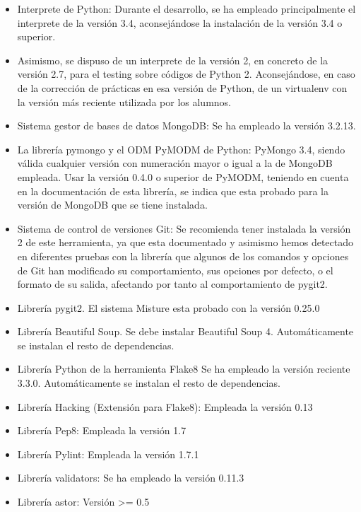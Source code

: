 \begin{itemize}
\item Interprete de Python:	Durante el desarrollo, se ha empleado principalmente el interprete de la versión 3.4, aconsejándose la instalación de la versión 3.4 o superior.

\item Asimismo, se dispuso de un interprete de la versión 2, en concreto de la versión 2.7, para el testing sobre códigos de Python 2. Aconsejándose, en caso de la corrección de prácticas en esa versión de Python, de un virtualenv con la versión más reciente utilizada por los alumnos.

\item Sistema gestor de bases de datos MongoDB: Se ha empleado la versión 3.2.13.

\item La librería pymongo y el ODM PyMODM de Python: PyMongo 3.4, siendo válida cualquier versión con numeración mayor o igual a la de MongoDB empleada.
	Usar la versión 0.4.0 o superior de PyMODM, teniendo en cuenta en la documentación de esta librería, se indica que esta probado para la versión de MongoDB que se tiene instalada.	

\item Sistema de control de versiones Git: Se recomienda tener instalada la versión 2 de este herramienta, ya que esta documentado y asimismo hemos detectado en diferentes pruebas con la librería que algunos de los comandos y opciones de Git han modificado su comportamiento, sus opciones por defecto, o el formato de su salida, afectando por tanto al comportamiento de pygit2.

\item Librería pygit2. El sistema Misture esta probado con la versión 0.25.0

\item Librería Beautiful Soup.
	Se debe instalar Beautiful Soup 4.
	Automáticamente se instalan el resto de dependencias.

\item Librería Python de la herramienta Flake8
	Se ha empleado la versión reciente 3.3.0.
	Automáticamente se instalan el resto de dependencias.
	
\item Librería Hacking (Extensión para Flake8): Empleada la versión 0.13

\item Librería Pep8: Empleada la versión 1.7

\item Librería Pylint: Empleada la versión 1.7.1

\item Librería validators: Se ha empleado la versión 0.11.3

\item Librería astor: Versión >= 0.5
\end{itemize}

